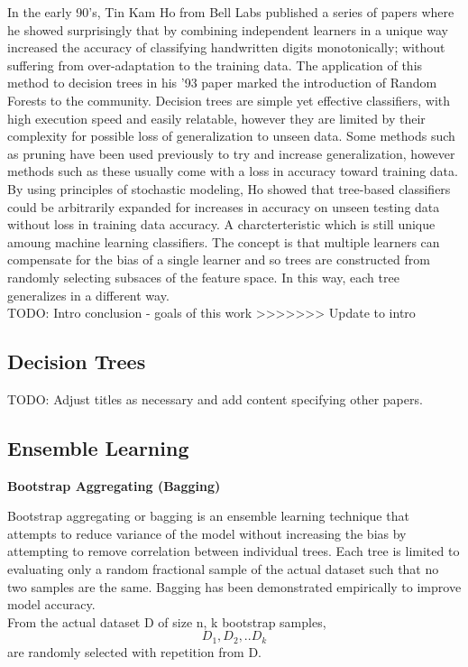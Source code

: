 \documentclass{article} %
\begin{document}
In the early 90's, Tin Kam Ho from Bell Labs published a series of papers where he showed surprisingly that by combining independent learners in a unique way increased the accuracy of classifying handwritten digits monotonically; without suffering from over-adaptation to the training data. \cite{Ho93, Ho95, Ho98} The application of this method to decision trees in his '93 paper marked the introduction of Random Forests to the community. \cite{Ho93} Decision trees are simple yet effective classifiers, with high execution speed and easily relatable, however they are limited by their complexity for possible loss of generalization to unseen data. Some methods such as pruning have been used previously to try and increase generalization, however methods such as these usually come with a loss in accuracy toward training data. By using principles of stochastic modeling, Ho showed that tree-based classifiers could be arbitrarily expanded for increases in accuracy on unseen testing data without loss in training data accuracy. A charcterteristic which is still unique amoung machine learning classifiers. The concept is that multiple learners can compensate for the bias of a single learner and so trees are constructed from randomly selecting subsaces of the feature space. In this way, each tree generalizes in a different way. \\
TODO: Intro conclusion - goals of this work
>>>>>>> Update to intro

\subsection{Decision Trees}
TODO: Adjust titles as necessary and add content specifying other papers.

\subsection{Ensemble Learning}
\textbf{Bootstrap Aggregating (Bagging)}

Bootstrap aggregating or bagging is an ensemble learning technique that attempts to reduce variance of the model without increasing the bias by attempting to remove correlation between individual trees. Each tree is limited to evaluating only a random fractional sample of the actual dataset such that no two samples are the same. Bagging has been demonstrated empirically to improve model accuracy. \cite{Aslam07}\\

From the actual dataset D of size n, k bootstrap samples, \[ D_1,D_2,..D_k  \] are randomly selected with repetition from D. 
\end{document}
